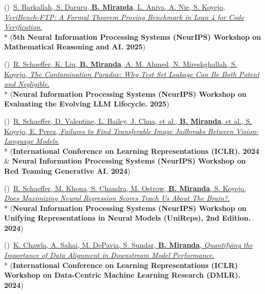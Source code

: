 \documentclass{article}
\newenvironment{changemargin}[2]{%
  \begin{list}{}{%
    \setlength{\topsep}{0pt}%
    \setlength{\leftmargin}{#1}%
    \setlength{\rightmargin}{#2}%
    \setlength{\listparindent}{\parindent}%
    \setlength{\itemindent}{\parindent}%
    \setlength{\parsep}{\parskip}%
  }%
  \item[]}{\end{list}
}
\newenvironment{body} {
		\vspace*{-16pt}
		\begin{changemargin}{-0.25in}{-0.5in}
	  }
		{\end{changemargin}\vspace{8pt plus 12pt}
	}
\newcounter{pubnum}
\newcommand{\pubitem}{\stepcounter{pubnum}(\thepubnum)~}
\begin{document}
\begin{body}
    \vspace{10pt}
    \pubitem \href{https://openreview.net/forum?id=wDjOpXKgtU}
    {S. Barkallah, S. Daruru, \textbf{B. Miranda}, L. Aniva, A. Nie, S. Koyejo,
    \emph{VeriBench-FTP: A Formal Theorem Proving Benchmark in Lean 4 for Code Verification}.}
    \\*
    (\textbf{5th Neural Information Processing Systems (NeurIPS) Workshop on Mathematical Reasoning and AI. 2025})

    \vspace{10pt}
    \pubitem \href{https://openreview.net/forum?id=Ajr8YtfhVO}
    {R. Schaeffer, K. Liu, \textbf{B. Miranda}, A. M. Ahmed, N. Mireshghallah, S. Koyejo,
    \emph{The Contamination Paradox: Why Test Set Leakage Can Be Both Potent and Negligible}.}
    \\*
    (\textbf{Neural Information Processing Systems (NeurIPS) Workshop on Evaluating the Evolving LLM Lifecycle. 2025})

    \vspace{10pt}
    \pubitem \href{https://openreview.net/forum?id=wvFnqVVUhN}
    {R. Schaeffer, D. Valentine, L. Bailey, J. Chua, et al., \textbf{B. Miranda}, et al., S. Koyejo, E. Perez,
    \emph{Failures to Find Transferable Image Jailbreaks Between Vision-Language Models}.}
    \\*
    (\textbf{International Conference on Learning Representations (ICLR). 2024} \& \textbf{Neural Information Processing Systems (NeurIPS) Workshop on Red Teaming Generative AI. 2024})

    \vspace{10pt}
    \pubitem \href{https://openreview.net/forum?id=f6IB0WrOKS}
    {R. Schaeffer, M. Khona, S. Chandra, M. Ostrow, \textbf{B. Miranda}, S. Koyejo,
    \emph{Does Maximizing Neural Regression Scores Teach Us About The Brain?}.}
    \\*
    (\textbf{Neural Information Processing Systems (NeurIPS) Workshop on Unifying Representations in Neural Models (UniReps), 2nd Edition. 2024})

    \vspace{10pt}
    \pubitem \href{https://arxiv.org/abs/2501.08496}
    {K. Chawla, A. Sahai, M. DePavia, S. Sundar, \textbf{B. Miranda},
    \emph{Quantifying the Importance of Data Alignment in Downstream Model Performance}.}
    \\*
    (\textbf{International Conference on Learning Representations (ICLR) Workshop on Data-Centric Machine Learning Research (DMLR). 2024})


\end{body}
\end{document}
